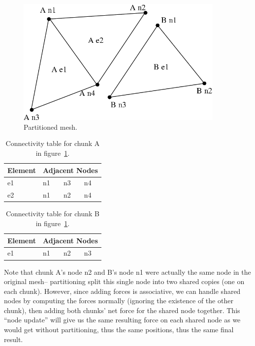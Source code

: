 \documentclass[10pt]{article}
\begin{document}
\begin{figure}[h]
\begin{center}
\includegraphics[width=4in]{fig/partitioned_mesh}
\end{center}
\caption{Partitioned mesh.}
\label{fig:partitionedmesh}
\end{figure}

\begin{table}[hh]
\begin{center}
\begin{tabular}{||l||l|l|l||}\hline
Element & \multicolumn{3}{c||}{Adjacent Nodes} \\\hline
e1 & n1 & n3 & n4 \\
e2 & n1 & n2 & n4 \\
\hline
\end{tabular}
\end{center}
\caption{Connectivity table for chunk A in figure~\ref{fig:partitionedmesh}.}
\label{table:chunkA}
\end{table}

\begin{table}[hh]
\begin{center}
\begin{tabular}{||l||l|l|l||}\hline
Element & \multicolumn{3}{c||}{Adjacent Nodes}\\\hline
e1 & n1 & n2 & n3 \\
\hline
\end{tabular}
\end{center}
\caption{Connectivity table for chunk B in figure~\ref{fig:partitionedmesh}.}
\label{table:chunkB}
\end{table}

Note that chunk A's node n2 and B's node n1 were actually the same node in
the original mesh-- partitioning split this single node into two shared
copies (one on each chunk).  However, since adding forces is associative, we
can handle shared nodes by computing the forces normally (ignoring the
existence of the other chunk), then adding both chunks' net force for the
shared node together.  This ``node update'' will give us the same resulting
force on each shared node as we would get without partitioning, thus the
same positions, thus the same final result.  
\end{document}
